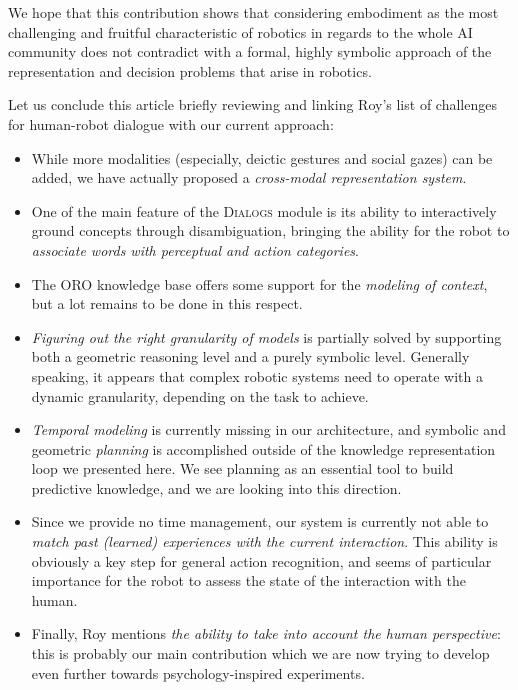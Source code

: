 \documentclass{svmult}
\begin{document}
We hope that this contribution shows that considering embodiment as the most
challenging and fruitful characteristic of robotics in regards to the whole AI
community does not contradict with a formal, highly symbolic approach of the
representation and decision problems that arise in robotics. 

Let us conclude this article briefly reviewing and linking Roy's list of challenges
for human-robot dialogue with our current approach: 
\begin{itemize}

	\item While more modalities (especially, deictic gestures and social gazes)
	can be added, we have actually proposed a \emph{cross-modal
	representation system}.

	\item One of the main feature of the \textsc{Dialogs} module is its ability
	to interactively ground concepts through disambiguation, bringing the
	ability for the robot to \emph{associate words with perceptual and action
	categories}.

	\item The ORO knowledge base offers some support for the \emph{modeling of
	context}, but a lot remains to be done in this respect.

	\item \emph{Figuring out the right granularity of models} is partially
	solved by supporting both a geometric reasoning level and a purely symbolic
	level. Generally speaking, it appears that complex robotic systems need
	to operate with a dynamic granularity, depending on the task to achieve.

	\item \emph{Temporal modeling} is currently missing in our architecture,
	and symbolic and geometric \emph{planning} is accomplished outside of the
	knowledge representation loop we presented here. We see planning as an
	essential tool to build predictive knowledge, and we are looking into this
	direction.

	\item Since we provide no time management, our system is currently not able
	to \emph{match past (learned) experiences with the current interaction}.
	This ability is obviously a key step for general action recognition, and
	seems of particular importance for the robot to assess the state of the
	interaction with the human.

	\item Finally, Roy mentions \emph{the ability to take into account the
	human perspective}: this is probably our main contribution which we are now
	trying to develop even further towards psychology-inspired experiments.

\end{itemize}









\end{document}
